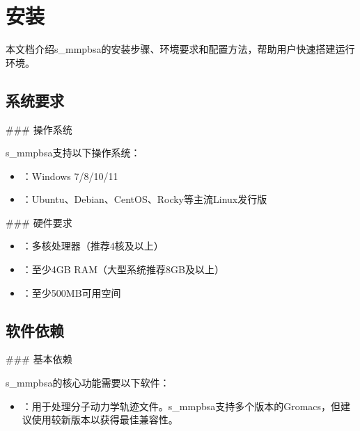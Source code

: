\documentclass[letterpaper,10pt,english]{sphinxmanual}
\begin{document}
\sphinxstepscope


\chapter{安装}
\label{\detokenize{installation:id1}}\label{\detokenize{installation::doc}}
\sphinxAtStartPar
本文档介绍s\_mmpbsa的安装步骤、环境要求和配置方法，帮助用户快速搭建运行环境。


\section{系统要求}
\label{\detokenize{installation:id2}}
\sphinxAtStartPar
\#\#\# 操作系统

\sphinxAtStartPar
s\_mmpbsa支持以下操作系统：
\begin{itemize}
\item {} 
\sphinxAtStartPar
{}：Windows 7/8/10/11

\item {} 
\sphinxAtStartPar
{}：Ubuntu、Debian、CentOS、Rocky等主流Linux发行版

\end{itemize}

\sphinxAtStartPar
\#\#\# 硬件要求
\begin{itemize}
\item {} 
\sphinxAtStartPar
{}：多核处理器（推荐4核及以上）

\item {} 
\sphinxAtStartPar
{}：至少4GB RAM（大型系统推荐8GB及以上）

\item {} 
\sphinxAtStartPar
{}：至少500MB可用空间

\end{itemize}


\section{软件依赖}
\label{\detokenize{installation:id3}}
\sphinxAtStartPar
\#\#\# 基本依赖

\sphinxAtStartPar
s\_mmpbsa的核心功能需要以下软件：
\begin{itemize}
\item {} 
\sphinxAtStartPar
{}：用于处理分子动力学轨迹文件。s\_mmpbsa支持多个版本的Gromacs，但建议使用较新版本以获得最佳兼容性。

\end{itemize}
\end{document}
